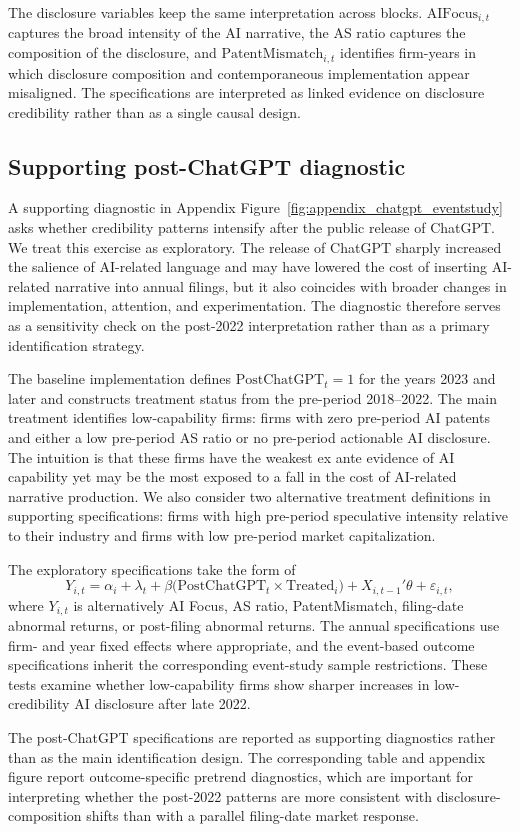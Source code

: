 The disclosure variables keep the same interpretation across blocks. $\mathrm{AIFocus}_{i,t}$ captures the broad intensity of the AI narrative, the AS ratio captures the composition of the disclosure, and $\mathrm{PatentMismatch}_{i,t}$ identifies firm-years in which disclosure composition and contemporaneous implementation appear misaligned. The specifications are interpreted as linked evidence on disclosure credibility rather than as a single causal design.

\subsection{Supporting post-ChatGPT diagnostic}

A supporting diagnostic in Appendix Figure~\ref{fig:appendix_chatgpt_eventstudy} asks whether credibility patterns intensify after the public release of ChatGPT. We treat this exercise as exploratory. The release of ChatGPT sharply increased the salience of AI-related language and may have lowered the cost of inserting AI-related narrative into annual filings, but it also coincides with broader changes in implementation, attention, and experimentation. The diagnostic therefore serves as a sensitivity check on the post-2022 interpretation rather than as a primary identification strategy.

The baseline implementation defines $\mathrm{PostChatGPT}_t=1$ for the years 2023 and later and constructs treatment status from the pre-period 2018--2022. The main treatment identifies low-capability firms: firms with zero pre-period AI patents and either a low pre-period AS ratio or no pre-period actionable AI disclosure. The intuition is that these firms have the weakest ex ante evidence of AI capability yet may be the most exposed to a fall in the cost of AI-related narrative production. We also consider two alternative treatment definitions in supporting specifications: firms with high pre-period speculative intensity relative to their industry and firms with low pre-period market capitalization.

The exploratory specifications take the form of
\[
Y_{i,t}
=
\alpha_i + \lambda_t + \beta \big(\mathrm{PostChatGPT}_t \times \mathrm{Treated}_i\big) + X_{i,t-1}'\theta + \varepsilon_{i,t},
\]
where $Y_{i,t}$ is alternatively AI Focus, AS ratio, PatentMismatch, filing-date abnormal returns, or post-filing abnormal returns. The annual specifications use firm- and year fixed effects where appropriate, and the event-based outcome specifications inherit the corresponding event-study sample restrictions. These tests examine whether low-capability firms show sharper increases in low-credibility AI disclosure after late 2022.

The post-ChatGPT specifications are reported as supporting diagnostics rather than as the main identification design. The corresponding table and appendix figure report outcome-specific pretrend diagnostics, which are important for interpreting whether the post-2022 patterns are more consistent with disclosure-composition shifts than with a parallel filing-date market response.
